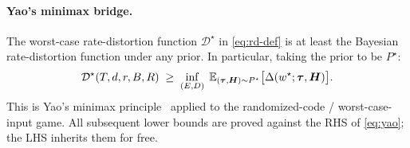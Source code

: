 \paragraph{Yao's minimax bridge.} The worst-case rate-distortion
function $\mathcal{D}^\star$ in \eqref{eq:rd-def} is at least the
Bayesian rate-distortion function under any prior. In particular,
taking the prior to be $P^\star$:
\begin{equation}\label{eq:yao}
  \mathcal{D}^\star(T,d,r,B,R)
  \;\geq\;
  \inf_{(E,D)}\;\mathbb{E}_{(\boldsymbol\tau,\boldsymbol H)\sim P^\star}
    \bigl[\Delta(w^\star;\boldsymbol\tau,\boldsymbol H)\bigr].
\end{equation}
This is Yao's minimax principle~\cite{yao1977} applied to the
randomized-code / worst-case-input game. All subsequent lower
bounds are proved against the RHS of \eqref{eq:yao}; the LHS
inherits them for free.
